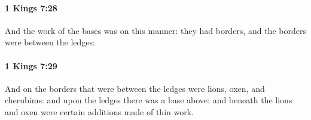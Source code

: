 		\paragraph{1 Kings 7:28} %
			\label{1KINGS-7-28}

			And the work of the bases was on this manner: they had borders, and the borders were between the ledges:


		\paragraph{1 Kings 7:29} %
			\label{1KINGS-7-29}

			And on the borders that were between the ledges were lions, oxen, and cherubims: and upon the ledges there was a base above: and beneath the lions and oxen were certain additions made of thin work.


